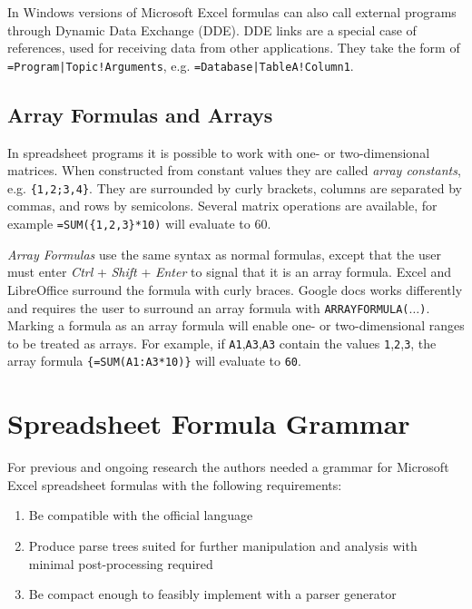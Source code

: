 \documentclass[conference]{IEEEtran}
\begin{document}
In Windows versions of Microsoft Excel formulas can also call external programs through Dynamic Data Exchange (DDE). DDE links are a special case of references, used for receiving data from other applications. They take the form of \texttt{=Program|Topic!Arguments}, e.g. \texttt{=Database|TableA!Column1}.

\subsection{Array Formulas and Arrays}
\label{sec:arrayformulas}
In spreadsheet programs it is possible to work with one- or two-dimensional matrices. When constructed from constant values they are called \emph{array constants}, e.g. \texttt{\{1,2;3,4\}}.
They are surrounded by curly brackets, columns are separated by commas, and rows by semicolons.
Several matrix operations are available, for example \texttt{=SUM(\{1,2,3\}*10)} will evaluate to 60.

\emph{Array Formulas} use the same syntax as normal formulas, except that the user must enter \emph{Ctrl} + \emph{Shift} + \emph{Enter} to signal that it is an array formula.
Excel and LibreOffice surround the formula with curly braces.
Google docs works differently and requires the user to surround an array formula with \texttt{ARRAYFORMULA($\ldots$)}. Marking a formula as an array formula will enable one- or two-dimensional ranges to be treated as arrays.
For example, if \texttt{A1},\texttt{A3},\texttt{A3} contain the values \texttt{1},\texttt{2},\texttt{3}, the array formula \texttt{\{=SUM(A1:A3*10)\}} will evaluate to \texttt{60}.

\section{Spreadsheet Formula Grammar}
\label{section:grammar}

For previous and ongoing research the authors needed a grammar for Microsoft Excel spreadsheet formulas with the following requirements:

\label{sec:designgoals}
\begin{enumerate}
\item Be compatible with the official language
\item Produce parse trees suited for further manipulation and analysis with minimal post-processing required
\item Be compact enough to feasibly implement with a parser generator
\end{enumerate}
\end{document}
